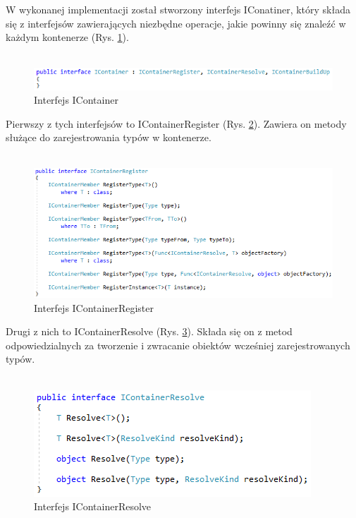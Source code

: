 \documentclass[12pt]{article}
\begin{document}
W wykonanej implementacji został stworzony interfejs IConatiner, który składa się z interfejsów zawierających niezbędne operacje, jakie powinny się znaleźć w każdym kontenerze (Rys. \ref{fig:IContainer}).\\ \\
\begin{figure}[H]
	\begin{center}
  		\includegraphics{IContainer.png}
  		\caption{Interfejs IContainer}
  		\label{fig:IContainer}
	\end{center}
\end{figure}
Pierwszy z tych interfejsów to IContainerRegister (Rys. \ref{fig:IContainerRegister}). Zawiera on metody służące do zarejestrowania typów w kontenerze.\\ \\
\begin{figure}[H]
	\begin{center}
  		\includegraphics{IContainerRegister.png}
  		\caption{Interfejs IContainerRegister}
  		\label{fig:IContainerRegister}
	\end{center}
\end{figure}
Drugi z nich to IContainerResolve (Rys. \ref{fig:IContainerResolve}). Składa się on z metod odpowiedzialnych za  tworzenie i zwracanie obiektów wcześniej zarejestrowanych typów.\\ \\
\begin{figure}[H]
	\begin{center}
  		\includegraphics{IContainerResolve.png}
  		\caption{Interfejs IContainerResolve}
  		\label{fig:IContainerResolve}
	\end{center}
\end{figure}
\end{document}
